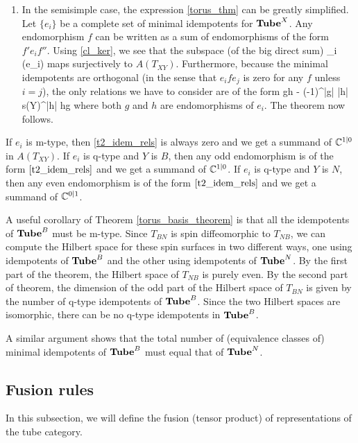 \begin{enumerate}
\item In the semisimple case, the expression \eqref{torus_thm} can be greatly simplified.
Let $\{e_i\}$ be a complete set of minimal idempotents for $\textbf{Tube}^X$.
Any endomorphism $f$ can be written as a sum of endomorphisms of the form $f' e_i f''$.
Using \eqref{cl_ker}, we see that the subspace (of the big direct sum)
\be
	\bigoplus_i \End(e_i)
\ee
maps surjectively to $A(T_{XY})$.
Furthermore, because the minimal idempotents are orthogonal (in the sense that $e_i f e_j$ is zero for any $f$ unless $i=j$),
the only relations we have to consider are of the form
\be \label{t2_idem_rels}
	gh - (-1)^{|g| |h|} s(Y)^{|h|} hg
\ee
where both $g$ and $h$ are endomorphisms of $e_i$.
The theorem now follows.
\end{enumerate}

If $e_i$ is m-type, then \eqref{t2_idem_rels} is always zero and we get a summand of $\mathbb{C}^{1|0}$ in $A(T_{XY})$.
If $e_i$ is q-type and $Y$ is $B$, then any odd endomorphism is of the form $\eqref{t2_idem_rels}$
and we get a summand of $\mathbb{C}^{1|0}$.
If $e_i$ is q-type and $Y$ is $N$, then any even endomorphism is of the form $\eqref{t2_idem_rels}$
and we get a summand of $\mathbb{C}^{0|1}$.

A useful corollary of Theorem \ref{torus_basis_theorem} is that all the idempotents of 
$\textbf{Tube}^B$ must be m-type.
Since $T_{BN}$ is spin diffeomorphic to $T_{NB}$, we can compute the Hilbert space for 
these spin surfaces in two different ways, one using
idempotents of $\textbf{Tube}^B$ and the other using idempotents of $\textbf{Tube}^N$.
By the first part of the theorem, the Hilbert space of $T_{NB}$ is purely even.
By the second part of theorem, the dimension of the odd part of the Hilbert space of $T_{BN}$
is given by the number of q-type idempotents of $\textbf{Tube}^B$.
Since the two Hilbert spaces are isomorphic, there can be no q-type idempotents in $\textbf{Tube}^B$.

A similar argument shows that the total number of (equivalence classes of) minimal idempotents of $\textbf{Tube}^B$
must equal that of $\textbf{Tube}^N$.



\subsection{Fusion rules} \label{fusion_rules}

In this subsection, we will define the fusion (tensor product) of representations of the tube category.

